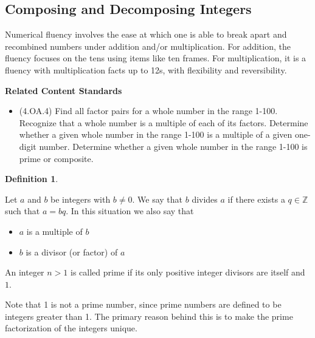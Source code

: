 \documentclass[
]{book}
\providecommand{\tightlist}{%
  \setlength{\itemsep}{0pt}\setlength{\parskip}{0pt}}
\newenvironment{standards}{}{}
\theoremstyle{definition}
\newtheorem{definition}{Definition}[chapter]
\theoremstyle{definition}
\theoremstyle{definition}
\theoremstyle{definition}
\theoremstyle{remark}
\begin{document}
\hypertarget{composing-and-decomposing-integers}{%
\subsection{Composing and Decomposing Integers}\label{composing-and-decomposing-integers}}

Numerical fluency involves the ease at which one is able to break apart and recombined numbers under addition and/or multiplication. For addition, the fluency focuses on the tens using items like ten frames. For multiplication, it is a fluency with multiplication facts up to 12s, with flexibility and reversibility.

\begin{standards}

\begin{center}
\textbf{Related Content Standards}

\end{center}

\begin{itemize}
\tightlist
\item
  (4.OA.4) Find all factor pairs for a whole number in the range 1-100. Recognize that a whole number is a multiple of each of its factors. Determine whether a given whole number in the range 1-100 is a multiple of a given one-digit number. Determine whether a given whole number in the range 1-100 is prime or composite.
\end{itemize}

\end{standards}

\begin{definition}
\protect\hypertarget{def:unlabeled-div-104}{}\label{def:unlabeled-div-104}

Let \(a\) and \(b\) be integers with \(b\neq 0\). We say that \(b\) divides \(a\) if there exists a \(q\in \mathbb{Z}\) such that \(a=bq\). In this situation we also say that

\begin{itemize}
\item
  \(a\) is a multiple of \(b\)
\item
  \(b\) is a divisor (or factor) of \(a\)
\end{itemize}

An integer \(n>1\) is called prime if its only positive integer divisors are itself and \(1\).

\end{definition}

Note that 1 is not a prime number, since prime numbers are defined to be integers greater than 1. The primary reason behind this is to make the prime factorization of the integers unique.
\end{document}
